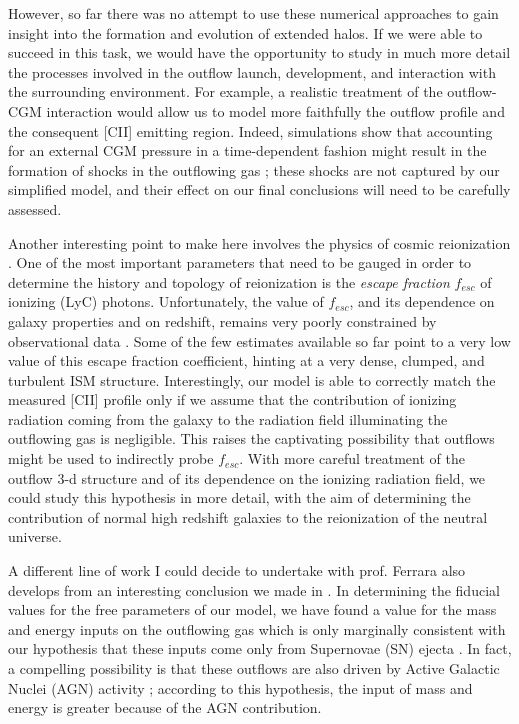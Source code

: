 \documentclass[12pt]{article}
\begin{document}
However, so far there was no attempt to use these numerical approaches to gain insight into the formation and evolution of extended halos. If we were able to succeed in this task, we would have the opportunity to study in much more detail the processes involved in the outflow launch, development, and interaction with the surrounding environment. For example, a realistic treatment of the outflow-CGM interaction would allow us to model more faithfully the outflow profile and the consequent [CII] emitting region. Indeed, simulations show that accounting for an external CGM pressure in a time-dependent fashion
might result in the formation of shocks in the outflowing gas \citep{samui:2008,gray2019catastrophic, Lochaas:2020}; these shocks are not captured by our simplified model, and their effect on our final conclusions will need to be carefully assessed.

Another interesting point to make here involves the physics of cosmic reionization \citep{mesinger_2016}. One of the most important parameters that need to be gauged in order to determine the history and topology of reionization is the \textit{escape fraction} $f_{esc}$ of ionizing (LyC) photons. Unfortunately, the value of $f_{esc}$, and its dependence on galaxy properties and on redshift, remains very poorly constrained by observational data \citep{inoue2006escape, Dayal:2018hft}. Some of the few estimates available so far \citep[e.g.,][]{Paardekooper:2015via} point to a very low value of this escape fraction coefficient, hinting at a very dense, clumped, and turbulent ISM structure. Interestingly, our model \citep{Pizzati20} is able to correctly match the measured [CII] profile \citep{Fujimoto19} only if we assume that the contribution of ionizing radiation coming from the galaxy to the radiation field illuminating the outflowing gas is negligible. This raises the captivating possibility that outflows might be used to indirectly
probe $f_{esc}$. With more careful treatment of the outflow 3-d structure and of its dependence on the ionizing radiation field, we could study this hypothesis in more detail, with the aim of determining the contribution of normal high redshift galaxies to the reionization of the neutral universe. 


A different line of work I could decide to undertake with prof. Ferrara also develops from an interesting conclusion we made in \citet{Pizzati20}. In determining the fiducial values for the free parameters of our model, we have found a value for the mass and energy inputs on the outflowing gas which is only marginally consistent with our hypothesis that these inputs come only from Supernovae (SN) ejecta \citep{Heckman15}. In fact, a compelling possibility is that these outflows are also driven by Active Galactic Nuclei (AGN) activity \citep{Fiore_2017}; according to this hypothesis, the input of mass and energy is greater because of the AGN contribution. 
\end{document}
